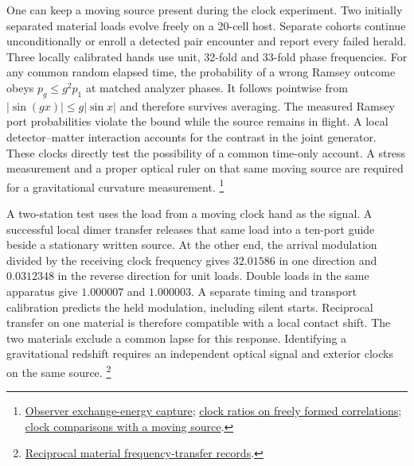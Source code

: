 \documentclass[11pt]{article}
\begin{document}
One can keep a moving source present during the clock experiment.
Two initially separated material loads evolve freely on a 20-cell
host. Separate cohorts continue unconditionally or enroll a detected
pair encounter and report every failed herald. Three locally
calibrated hands use unit, 32-fold and 33-fold phase frequencies.
For any common random elapsed time, the probability of a wrong Ramsey
outcome obeys $p_g\leq g^2p_1$ at matched analyzer phases. It follows
pointwise from $|\sin(gx)|\leq g|\sin x|$ and therefore survives
averaging. The measured Ramsey port probabilities violate the bound
while the source remains in flight. A local detector--matter
interaction accounts for the contrast in the joint generator. These
clocks directly test the possibility of a common time-only account.
A stress measurement and a proper optical ruler on that same moving
source are required for a gravitational curvature measurement.%
\footnote{\href{https://github.com/FloatingPragma/observer-patch-holography/tree/main/model/experiments/material_inertia/sourced_survey}{Observer exchange-energy capture};
\href{https://github.com/FloatingPragma/observer-patch-holography/tree/main/code/matched_einstein_limit/source_implication/full_geometry/station_balls/reciprocal_screen/range_contraction/formed_ranges}{clock ratios on freely formed correlations};
\href{https://github.com/FloatingPragma/observer-patch-holography/tree/main/model/candidate_laws/interval_echo/openwave/row_27_metric/formed_pair_clocks}{clock comparisons with a moving source}.}

A two-station test uses the load from a moving clock hand as the signal.
A successful local dimer transfer releases that same load into a ten-port
guide beside a stationary written source. At the other end, the arrival
modulation divided by the receiving clock frequency gives $32.01586$ in
one direction and $0.0312348$ in the reverse direction for unit loads.
Double loads in the same apparatus give $1.000007$ and $1.000003$.
A separate timing and transport calibration predicts the held modulation,
including silent starts. Reciprocal transfer on one material is therefore
compatible with a local contact shift. The two materials exclude a common
lapse for this response. Identifying a gravitational redshift requires
an independent optical signal and exterior clocks on the same source.%
\footnote{\href{https://github.com/FloatingPragma/observer-patch-holography/tree/main/model/candidate_laws/interval_echo/openwave/row_27_metric/frequency_link}{Reciprocal material frequency-transfer records}.}
\end{document}

